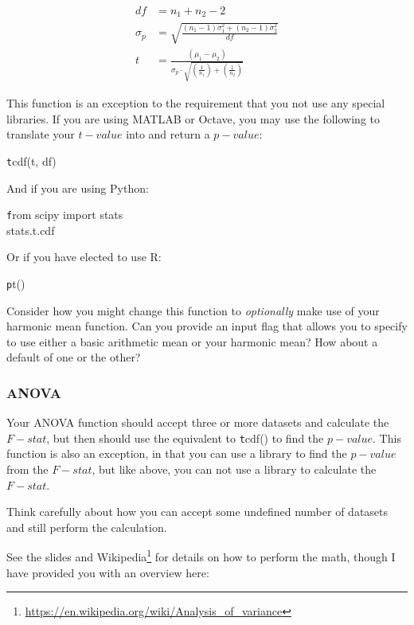\documentclass[11pt]{article}
\begin{document}
\begin{align*}
    df &= n_1 + n_2 - 2 \\
    \sigma_p &= \sqrt{ \frac{(n_1-1)\sigma_1^2 + (n_2-1)\sigma_2^2}{df} } \\
    t &= \frac{(\mu_1 - \mu_2)}{\sigma_p \cdot \sqrt{(\frac{1}{n_1}) + (\frac{1}{n_2})}}
\end{align*}

This function is an exception to the requirement that you not use any special libraries.  If you are using MATLAB or Octave, you may use the following to translate your $t-value$ into and return a $p-value$:

{\texttt tcdf(t, df)}

And if you are using Python:

{\texttt from scipy import stats\\stats.t.cdf}

Or if you have elected to use R:

{\texttt pt()}

Consider how you might change this function to {\em optionally} make use of your harmonic mean function.  Can you provide an input flag that allows you to specify to use either a basic arithmetic mean or your harmonic mean?  How about a default of one or the other?

\subsubsection*{ANOVA}
Your ANOVA function should accept three or more datasets and calculate the $F-stat$, but then should use the equivalent to {\texttt tcdf()} to find the $p-value$.  This function is also an exception, in that you can use a library to find the $p-value$ from the $F-stat$, but like above, you can not use a library to calculate the $F-stat$.

Think carefully about how you can accept some undefined number of datasets and still perform the calculation.

See the slides and Wikipedia\footnote{\url{https://en.wikipedia.org/wiki/Analysis_of_variance}} for details on how to perform the math, though I have provided you with an overview here:
\end{document}
